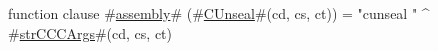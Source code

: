 function clause #\hyperref[sailMIPSzassembly]{assembly}# (#\hyperref[sailMIPSzCUnseal]{CUnseal}#(cd, cs, ct)) = "cunseal " ^ #\hyperref[sailMIPSzstrCCCArgs]{strCCCArgs}#(cd, cs, ct)
